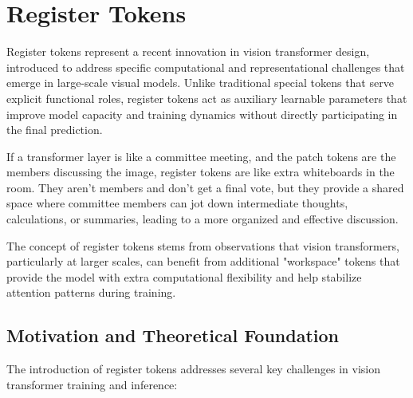 
\section{Register Tokens}

Register tokens represent a recent innovation in vision transformer design, introduced to address specific computational and representational challenges that emerge in large-scale visual models. Unlike traditional special tokens that serve explicit functional roles, register tokens act as auxiliary learnable parameters that improve model capacity and training dynamics without directly participating in the final prediction.

If a transformer layer is like a committee meeting, and the patch tokens are the members discussing the image, register tokens are like extra whiteboards in the room. They aren't members and don't get a final vote, but they provide a shared space where committee members can jot down intermediate thoughts, calculations, or summaries, leading to a more organized and effective discussion.

\begin{comment}
Feedback: This is a good, technical introduction. To make it more intuitive, you could use an analogy. For example: "If a transformer layer is like a committee meeting, and the patch tokens are the members discussing the image, register tokens are like extra whiteboards in the room. They aren't members and don't get a final vote, but they provide a shared space where committee members can jot down intermediate thoughts, calculations, or summaries, leading to a more organized and effective discussion."

STATUS: addressed - added committee meeting analogy to make register tokens more intuitive
\end{comment}

The concept of register tokens stems from observations that vision transformers, particularly at larger scales, can benefit from additional "workspace" tokens that provide the model with extra computational flexibility and help stabilize attention patterns during training.

\subsection{Motivation and Theoretical Foundation}

The introduction of register tokens addresses several key challenges in vision transformer training and inference:

